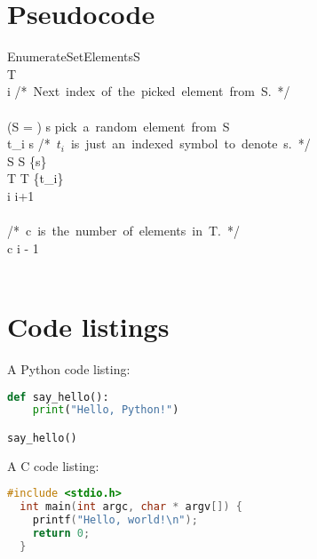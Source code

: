 \documentclass[12pt, letterpaper, oneside]{article}
\begin{document}
\section{Pseudocode}

\begin{pseudocode}[ruled]{EnumerateSetElements}{S}
   \\
  T \GETS \emptyset \\
  i  \mbox{/* Next index of the picked element from S. */} \\
  \\
  \WHILE \NOT (S = \emptyset) \DO
  \BEGIN
  s \GETS \mbox{pick a random element from S} \\
  t_i \GETS s \mbox{/* $t_i$ is just an indexed symbol to denote s. */} \\
  S \GETS S \setminus \{s\} \\
  T \GETS T \cup \{t_i\} \\
  i \GETS i+1
  \END \\
  \\
  \mbox{/* c is the number of elements in T. */} \\
  c \GETS i - 1 \\
  \\
\end{pseudocode}

\section{Code listings}

A Python code listing:

\begin{lstlisting}[language=Python]
def say_hello():
    print("Hello, Python!")

say_hello()
\end{lstlisting}

A C code listing:

\begin{lstlisting}[language=C]
  #include <stdio.h>
  int main(int argc, char * argv[]) {
    printf("Hello, world!\n");
    return 0;
  }
\end{lstlisting}
\end{document}
